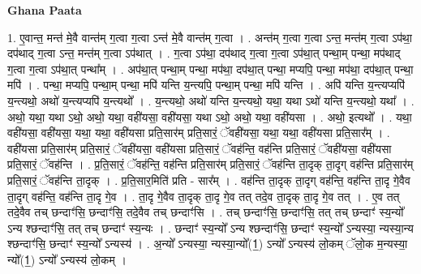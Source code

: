 \documentclass[17pt]{extarticle}
\begin{document}
\textbf{Ghana Paata } \newline

1. ए॒वान्त॒ मन्त॑ मे॒वै वान्त॑म् ग॒त्वा ग॒त्वा ऽन्त॑ मे॒वै वान्त॑म् ग॒त्वा । . अन्त॑म् ग॒त्वा ग॒त्वा ऽन्त॒ मन्त॑म् ग॒त्वा ऽप॑था॒ दप॑थाद् ग॒त्वा ऽन्त॒ मन्त॑म् ग॒त्वा ऽप॑थात् । . ग॒त्वा ऽप॑था॒ दप॑थाद् ग॒त्वा ग॒त्वा ऽप॑था॒त् पन्था॒म् पन्था॒ मप॑थाद् ग॒त्वा ग॒त्वा ऽप॑था॒त् पन्था᳚म् । . अप॑था॒त् पन्था॒म् पन्था॒ मप॑था॒ दप॑था॒त् पन्था॒ मप्यपि॒ पन्था॒ मप॑था॒ दप॑था॒त् पन्था॒ मपि॑ । . पन्था॒ मप्यपि॒ पन्था॒म् पन्था॒ मपि॑ यन्ति य॒न्त्यपि॒ पन्था॒म् पन्था॒ मपि॑ यन्ति । . अपि॑ यन्ति य॒न्त्यप्यपि॑ य॒न्त्यथो॒ अथो॑ य॒न्त्यप्यपि॑ य॒न्त्यथो᳚ । . य॒न्त्यथो॒ अथो॑ यन्ति य॒न्त्यथो॒ यथा॒ यथा ऽथो॑ यन्ति य॒न्त्यथो॒ यथा᳚ । . अथो॒ यथा॒ यथा ऽथो॒ अथो॒ यथा॒ वही॑यसा॒ वही॑यसा॒ यथा ऽथो॒ अथो॒ यथा॒ वही॑यसा । . अथो॒ इत्यथो᳚ । . यथा॒ वही॑यसा॒ वही॑यसा॒ यथा॒ यथा॒ वही॑यसा प्रति॒सार॑म् प्रति॒सारं॒ ॅवही॑यसा॒ यथा॒ यथा॒ वही॑यसा प्रति॒सार᳚म् । . वही॑यसा प्रति॒सार॑म् प्रति॒सारं॒ ॅवही॑यसा॒ वही॑यसा प्रति॒सारं॒ ॅवह॑न्ति॒ वह॑न्ति प्रति॒सारं॒ ॅवही॑यसा॒ वही॑यसा प्रति॒सारं॒ ॅवह॑न्ति । . प्र॒ति॒सारं॒ ॅवह॑न्ति॒ वह॑न्ति प्रति॒सार॑म् प्रति॒सारं॒ ॅवह॑न्ति ता॒दृक् ता॒दृग् वह॑न्ति प्रति॒सार॑म् प्रति॒सारं॒ ॅवह॑न्ति ता॒दृक् । . प्र॒ति॒सार॒मिति॑ प्रति - सार᳚म् । . वह॑न्ति ता॒दृक् ता॒दृग् वह॑न्ति॒ वह॑न्ति ता॒दृ गे॒वैव ता॒दृग् वह॑न्ति॒ वह॑न्ति ता॒दृ गे॒व । . ता॒दृ गे॒वैव ता॒दृक् ता॒दृ गे॒व तत् तदे॒व ता॒दृक् ता॒दृ गे॒व तत् । . ए॒व तत् तदे॒वैव तच् छन्दाꣳ॑सि॒ छन्दाꣳ॑सि॒ तदे॒वैव तच् छन्दाꣳ॑सि । . तच् छन्दाꣳ॑सि॒ छन्दाꣳ॑सि॒ तत् तच् छन्दाꣳ॑ स्य॒न्यो᳚ ऽन्य श्छन्दाꣳ॑सि॒ तत् तच् छन्दाꣳ॑ स्य॒न्यः । . छन्दाꣳ॑ स्य॒न्यो᳚ ऽन्य श्छन्दाꣳ॑सि॒ छन्दाꣳ॑ स्य॒न्यो᳚ ऽन्यस्या॒ न्यस्या॒न्य श्छन्दाꣳ॑सि॒ छन्दाꣳ॑ स्य॒न्यो᳚ ऽन्यस्य॑ । . अ॒न्यो᳚ ऽन्यस्या॒ न्यस्या॒न्यो᳚(1॒) ऽन्यो᳚ ऽन्यस्य॑ लो॒कम् ॅलो॒क म॒न्यस्या॒ न्यो᳚(1॒) ऽन्यो᳚ ऽन्यस्य॑ लो॒कम् । \newline
\end{document}
